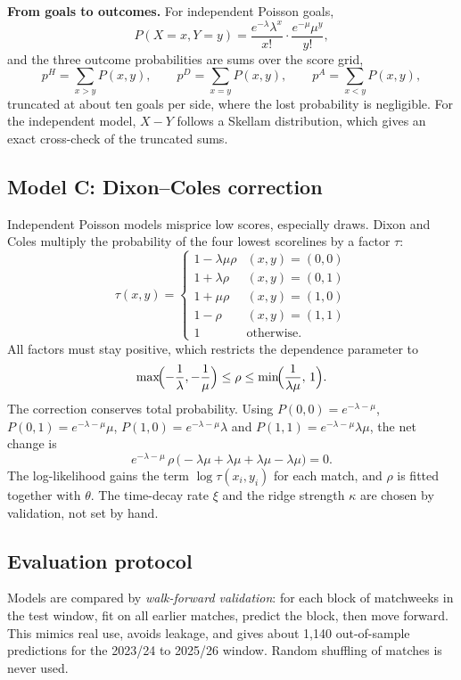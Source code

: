 \documentclass[12pt,a4paper]{article}
\begin{document}
\textbf{From goals to outcomes.} For independent Poisson goals,
\[
P(X=x,Y=y)=\frac{e^{-\lambda}\lambda^{x}}{x!}\cdot\frac{e^{-\mu}\mu^{y}}{y!},
\]
and the three outcome probabilities are sums over the score grid,
\[
p^{H}=\sum_{x>y}P(x,y),\qquad p^{D}=\sum_{x=y}P(x,y),\qquad p^{A}=\sum_{x<y}P(x,y),
\]
truncated at about ten goals per side, where the lost probability is negligible. For the independent
model, $X-Y$ follows a Skellam distribution, which gives an exact cross-check of the truncated sums.

\subsection{Model C: Dixon--Coles correction}

Independent Poisson models misprice low scores, especially draws. Dixon and Coles multiply the
probability of the four lowest scorelines by a factor $\tau$:
\[
\tau(x,y)=
\begin{cases}
1-\lambda\mu\rho & (x,y)=(0,0)\\
1+\lambda\rho & (x,y)=(0,1)\\
1+\mu\rho & (x,y)=(1,0)\\
1-\rho & (x,y)=(1,1)\\
1 & \text{otherwise.}
\end{cases}
\]
All factors must stay positive, which restricts the dependence parameter to
\[
\max\!\Bigl(-\frac{1}{\lambda},-\frac{1}{\mu}\Bigr)\le\rho\le\min\!\Bigl(\frac{1}{\lambda\mu},\,1\Bigr).
\]
The correction conserves total probability. Using $P(0,0)=e^{-\lambda-\mu}$,
$P(0,1)=e^{-\lambda-\mu}\mu$, $P(1,0)=e^{-\lambda-\mu}\lambda$ and $P(1,1)=e^{-\lambda-\mu}\lambda\mu$,
the net change is
\[
e^{-\lambda-\mu}\,\rho\,\bigl(-\lambda\mu+\lambda\mu+\lambda\mu-\lambda\mu\bigr)=0 .
\]
The log-likelihood gains the term $\log\tau(x_i,y_i)$ for each match, and $\rho$ is fitted together
with $\theta$. The time-decay rate $\xi$ and the ridge strength $\kappa$ are chosen by validation,
not set by hand.

\subsection{Evaluation protocol}

Models are compared by \emph{walk-forward validation}: for each block of matchweeks in the test
window, fit on all earlier matches, predict the block, then move forward. This mimics real use,
avoids leakage, and gives about 1{,}140 out-of-sample predictions for the 2023/24 to 2025/26 window.
Random shuffling of matches is never used.
\end{document}
